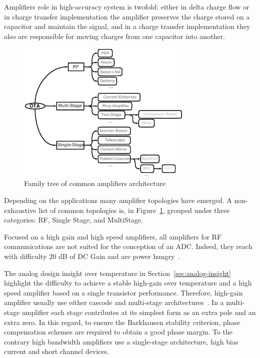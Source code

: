 Amplifiers role in high-accuracy system is twofold: either in delta charge flow or in charge transfer implementation the amplifier preserves the charge stored on a capacitor and maintain the signal, and in a charge transfer implementation they also are responsible for moving charges from one capacitor into another.

\begin{figure}[htp]
    \centering
    \includegraphics[width=0.75\textwidth]{Chapter7/Figs/family_amplifier.ps}
    \caption{Family tree of common amplifiers architecture}
    \label{fig:ota_tree}
\end{figure}

Depending on the applications many amplifier topologies have emerged. A non-exhaustive list of common topologies is, in Figure~\ref{fig:ota_tree}, grouped under three categories: RF, Single Stage, and MultiStage.

Focused on a high gain and high speed amplifiers, all amplifiers for RF communications are not suited for the conception of an ADC\@. Indeed, they reach with difficulty 20 dB of DC Gain and are power hungry~\cite{Nauta1992, Chen2014}.

The analog design insight over temperature in Section~\ref{sec:analog-insight} highlight the difficulty to achieve a stable high-gain over temperature and a high speed amplifier based on a single transistor performance. Therefore, high-gain amplifier usually use either cascode and multi-stage architectures~\cite{Bult1990}. In a multi-stage amplifier each stage contributes at its simplest form as an extra pole and an extra zero. In this regard, to ensure the Barkhausen stability criterion, phase compensation schemes are required to obtain a good phase margin. 
To the contrary high bandwidth amplifiers use a single-stage architecture, high bias current and short channel devices.

